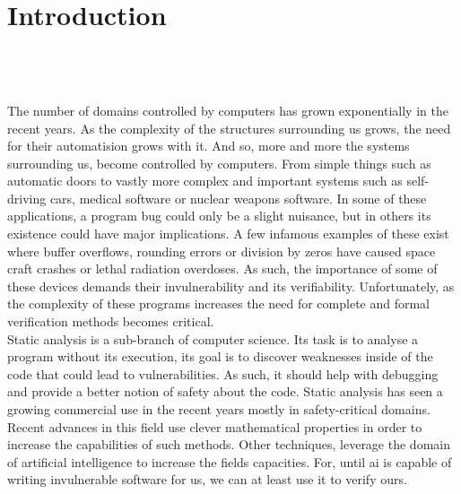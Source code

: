 
\setcounter{chapter}{0}

\chapter{Introduction}
\mbox{}\\
\mbox{}\\
\mbox{}\\
The number of domains controlled by computers has grown exponentially in the recent years. As the complexity of the structures surrounding us grows, the need for their automatision grows with it. And so, more and more the systems surrounding us, become controlled by computers. From simple things such as automatic doors to vastly more complex and important systems such as self-driving cars, medical software or nuclear weapons software. In some of these applications, a program bug could only be a slight nuisance, but in others its existence could have major implications. A few infamous examples of these exist where buffer overflows, rounding errors or division by zeros have caused space craft crashes or lethal radiation overdoses. As such, the importance of some of these devices demands their invulnerability and its verifiability. Unfortunately, as the complexity of these programs increases the need for complete and formal verification methods becomes critical.\\
Static analysis is a sub-branch of computer science. Its task is to analyse a program without its execution, its goal is to discover weaknesses inside of the code that could lead to vulnerabilities. As such, it should help with debugging and provide a better notion of safety about the code. Static analysis has seen a growing commercial use in the recent years mostly in safety-critical domains. Recent advances in this field use clever mathematical properties in order to increase the capabilities of such methods. Other techniques, leverage the domain of artificial intelligence to increase the fields capacities. For, until ai is capable of writing invulnerable software for us, we can at least use it to verify ours.
